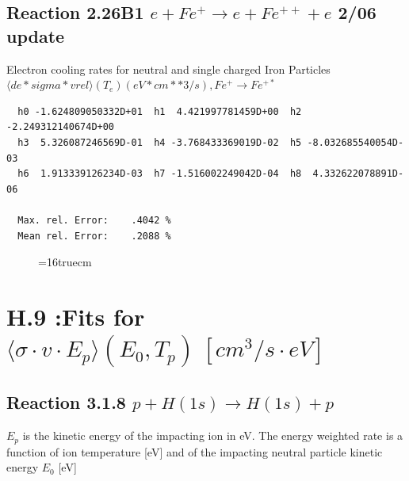 \documentclass[12pt,dvips]{article}
\begin{document}
\subsection{
Reaction 2.26B1 $e + Fe^+ \rightarrow e + Fe^{++} + e$ 2/06 update
}

  Electron cooling rates for neutral and single
  charged Iron Particles
 $  \langle de*sigma*vrel \rangle(T_e)  (eV*cm**3/s), Fe^+ \rightarrow Fe^{+*} $

\begin{small}\begin{verbatim}
  h0 -1.624809050332D+01  h1  4.421997781459D+00  h2 -2.249312140674D+00
  h3  5.326087246569D-01  h4 -3.768433369019D-02  h5 -8.032685540054D-03
  h6  1.913339126234D-03  h7 -1.516002249042D-04  h8  4.332622078891D-06

  Max. rel. Error:    .4042 %
  Mean rel. Error:    .2088 %

\end{verbatim}\end{small}

\begin{figure} \label{2.26Bl}
\epsfxsize=16truecm
\end{figure}
\newpage


\section{H.9 :Fits for $\langle\sigma \cdot v \cdot E_p \rangle (E_0,T_p) \ [cm^3/s
\cdot eV]$}

\subsection{
Reaction 3.1.8   $p + H(1s)  \rightarrow  H(1s) + p $
}
$E_p$ is the kinetic energy of the impacting ion in eV.
The energy weighted rate is a function of ion temperature
[eV]  and of the impacting neutral particle kinetic energy $E_0$ [eV]
\end{document}
